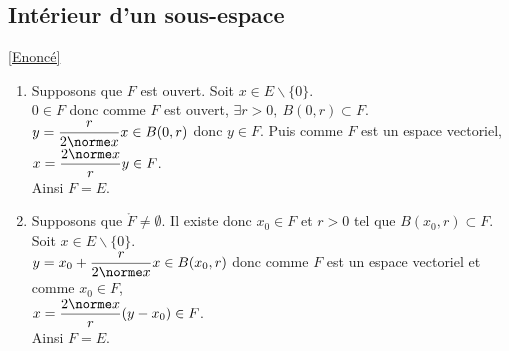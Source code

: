 \documentclass{book}
\begin{document}
	\subsection{Intérieur d'un sous-espace }
	\label{sec:interieur-dun-sev}
	\textcolor{blue}{\hyperref[Intérieur d'un sev]{[Enoncé]}}\\
	\begin{enumerate}[leftmargin=*]
		\item Supposons que $F$ est ouvert. Soit $x\in E\backslash\{0\}$.\\
		$0\in F$ donc comme $F$ est ouvert, $\exists r>0,\ B(0,r)\subset F$. $y=\dfrac{r}{2\norme x}x\in B(0,r)$ donc $y\in F$. Puis comme $F$ est un espace vectoriel, $x=\dfrac{2\norme x}{r}y\in F$.\\
		Ainsi $F=E$.
		\item Supposons que $\ring F\ne \emptyset$. Il existe donc $x_0\in F$ et $r>0$ tel que $B(x_0,r)\subset F$. Soit $x\in E\backslash\{0\}$.\\
		$y=x_0+\dfrac{r}{2\norme x}x\in B(x_0,r)$ donc comme $F$ est un espace vectoriel et comme $x_0\in F$,\\
		$x=\dfrac{2\norme x}{r}(y-x_0)\in F$.\\
		Ainsi $F=E$.
	\end{enumerate}
	
\end{document}
